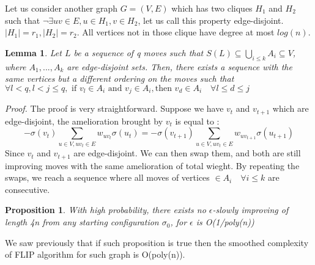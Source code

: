 \documentclass[12pt]{article}
\newtheorem{lemma}[theorem]{Lemma}
\newtheorem{proposition}[theorem]{Proposition}
\begin{document}
Let us consider another graph $G = (V, E)$ which has two cliques $H_1$ and $H_2$ such that $\neg\exists uv \in E, u \in H_1, v \in H_2$, let us call this property edge-disjoint. $|H_1| = r_1, |H_2| = r_2$. All vertices not in those clique have degree at most $log(n)$.

\begin{lemma}
\label{edgeDisjoint}
Let $L$ be a sequence of q moves such that $S(L) \subseteq \bigcup_{i \leq k}A_i  \subseteq V$, where $A_1, ... , A_k$ are edge-disjoint sets. Then, there exists a sequence with the same vertices but a different ordering on the moves such that $\forall l < q, l < j \leq q, \text{ if } v_l \in A_i \text{ and } v_j \in A_i, \text{then } v_d \in A_i \quad\forall l \leq d  \leq j$   
\end{lemma}
\textit{Proof.} The proof is very straightforward. Suppose we have $v_t$ and $v_{t+1}$ which are edge-disjoint, the amelioration brought by $v_t$ is equal to :
\begin{equation*}
-\sigma(v_t) \sum_{u \in V, uv_t \in E}w_{uv_t}\sigma(u_t) = -\sigma(v_{t+1}) \sum_{u \in V, uv_t \in E}w_{uv_{t+1}}\sigma(u_{t + 1}) 
\end{equation*}
Since $v_t$ and $v_{t+1}$ are edge-disjoint. We can then swap them, and both are still improving moves with the same amelioration of total wieght. By repeating the swaps, we reach a sequence where all moves of vertices $\in A_i \quad \forall i \leq k$ are consecutive.

\begin{proposition}
\label{secondProp}
With high probability, there exists no $\epsilon$-slowly improving of length 4n from any starting configuration $\sigma_0$, for $\epsilon$ is O(1/poly(n))
\end{proposition}

We saw previously that if such proposition is true then the smoothed complexity of FLIP algorithm for such graph is O(poly(n)).\\
\end{document}
